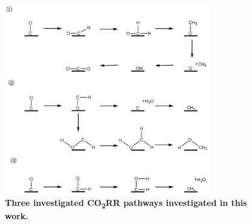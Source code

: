 \documentclass[a4paper, 12pt]{article}
\begin{document}
\begin{figure}[htbp]
  \centering
  \includegraphics[width=0.8\textwidth]{supp_fig8_co2rr_paths.png}
  \caption{\textbf{Three investigated CO\textsubscript{2}RR pathways \cite{durand2011structure, nie2014reaction, peterson2010copper} investigated in this work.}}
  \label{supp_fig8:co2rr_paths}
\end{figure}
\end{document}
